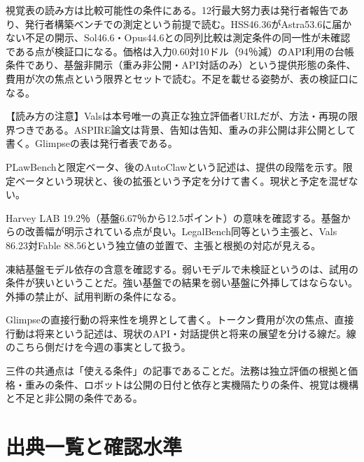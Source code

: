 \documentclass[lualatex,a4paper,10pt]{jlreq}
\begin{document}
視覚表の読み方は比較可能性の条件にある。12行最大努力表は発行者報告であり、発行者構築ベンチでの測定という前提で読む。HSS46.36がAstra53.6に届かない不足の開示、Sol46.6・Opus44.6との同列比較は測定条件の同一性が未確認である点が検証口になる。価格は入力0.60対10ドル（94％減）のAPI利用の台帳条件であり、基盤非開示（重み非公開・API対話のみ）という提供形態の条件、費用が次の焦点という限界とセットで読む。不足を載せる姿勢が、表の検証口になる。
\cite{B58,B59,B88}




\begin{tcolorbox}[colback=SurveySoft,colframe=SurveyRule,arc=1mm,boxrule=0.4pt,left=2mm,right=2mm]
【読み方の注意】Valsは本号唯一の真正な独立評価者URLだが、方法・再現の限界つきである。ASPIRE論文は背景、告知は告知、重みの非公開は非公開として書く。Glimpseの表は発行者表である。
\end{tcolorbox}
\cite{B55,B53,B54,B57,B56,B58,B59,B88}

PLawBenchと限定ベータ、後のAutoClawという記述は、提供の段階を示す。限定ベータという現状と、後の拡張という予定を分けて書く。現状と予定を混ぜない。
\cite{B55,B53,B54}


Harvey LAB 19.2％（基盤6.67％から12.5ポイント）の意味を確認する。基盤からの改善幅が明示されている点が良い。LegalBench同等という主張と、Vals 86.23対Fable 88.56という独立値の並置で、主張と根拠の対応が見える。
\cite{B55,B53,B54}


凍結基盤モデル依存の含意を確認する。弱いモデルで未検証というのは、試用の条件が狭いということだ。強い基盤での結果を弱い基盤に外挿してはならない。外挿の禁止が、試用判断の条件になる。
\cite{B57,B56}


Glimpseの直接行動の将来性を境界として書く。トークン費用が次の焦点、直接行動は将来という記述は、現状のAPI・対話提供と将来の展望を分ける線だ。線のこちら側だけを今週の事実として扱う。
\cite{B58,B59,B88}


三件の共通点は「使える条件」の記事であることだ。法務は独立評価の根拠と価格・重みの条件、ロボットは公開の日付と依存と実機隔たりの条件、視覚は機構と不足と非公開の条件である。
\cite{B55,B53,B54,B57,B56,B58,B59,B88}


\clearpage  %
\section*{出典一覧と確認水準}
\end{document}
